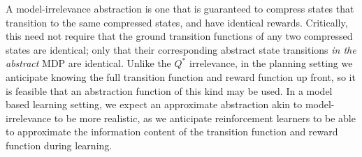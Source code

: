 A model-irrelevance abstraction is one that is guaranteed to compress states that transition to the same compressed states, and have identical rewards. Critically, this need not require that the ground transition functions of any two compressed states are identical; only that their corresponding abstract state transitions {\it in the abstract} MDP are identical. Unlike the $Q^*$ irrelevance, in the planning setting we anticipate knowing the full transition function and reward function up front, so it is feasible that an abstraction function of this kind may be used. In a model based learning setting, we expect an approximate abstraction akin to model-irrelevance to be more realistic, as we anticipate reinforcement learners to be able to approximate the information content of the transition function and reward function during learning.











